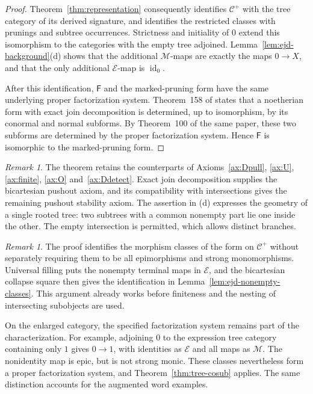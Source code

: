 \documentclass[11pt,a4paper]{article}
\theoremstyle{plain}
\theoremstyle{definition}
\theoremstyle{remark}
\newtheorem{remark}[theorem]{Remark}
\newcommand{\id}{\operatorname{id}}
\begin{document}
\begin{proof}
Theorem~\ref{thm:representation} consequently identifies
$\mathcal C^+$ with the tree category of its derived signature,
and identifies the restricted classes with prunings and subtree
occurrences. Strictness and initiality of $0$ extend this
isomorphism to the categories with the empty tree adjoined.
Lemma~\ref{lem:ejd-background}(d) shows that the additional
$\mathcal M$-maps are exactly the maps $0\to X$, and that
the only additional $\mathcal E$-map is $\id_0$.

After this identification, $\mathsf F$ and the marked-pruning
form have the same underlying proper factorization system.
Theorem~158 of \cite{JanelidzeVanNiekerk} states that a noetherian
form with exact join decomposition is determined, up to isomorphism,
by its conormal and normal subforms. By Theorem~100 of the same
paper, these two subforms are determined by the proper factorization
system. Hence $\mathsf F$ is isomorphic to the marked-pruning form.
\end{proof}

\begin{remark}
The theorem retains the counterparts of
Axioms~\ref{ax:Dpull}, \ref{ax:U}, \ref{ax:finite},
\ref{ax:O} and~\ref{ax:Ddetect}. Exact join decomposition
supplies the bicartesian pushout axiom, and its compatibility
with intersections gives the remaining pushout stability axiom.
The assertion in (d) expresses the geometry of a single rooted
tree: two subtrees with a common nonempty part lie one inside
the other. The empty intersection is permitted, which allows
distinct branches.
\end{remark}

\begin{remark}\label{rem:ejd-intrinsic-classes}
The proof identifies the morphism classes of the form on
$\mathcal C^+$ without separately requiring them to be all
epimorphisms and strong monomorphisms. Universal filling puts the
nonempty terminal maps in $\mathcal E$, and the bicartesian
collapse square then gives the identification in
Lemma~\ref{lem:ejd-nonempty-classes}. This argument already
works before finiteness and the nesting of intersecting subobjects
are used.

On the enlarged category, the specified factorization system
remains part of the characterization. For example, adjoining
$0$ to the expression tree category containing only
$1$ gives $0\to1$, with identities as $\mathcal E$ and all
maps as $\mathcal M$. The nonidentity map is epic, but is
not strong monic. These classes nevertheless form a proper
factorization system, and Theorem~\ref{thm:tree-cosub} applies.
The same distinction accounts for the augmented word examples.
\end{remark}
\end{document}
